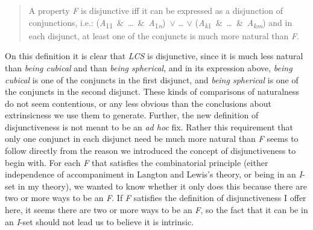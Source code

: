 \begin{quote}
A property \textit{F} is disjunctive iff it can be expressed as a disjunction of conjunctions, i.e.: (\textit{A}\textsubscript{11}~\&~{\dots}~\&~\textit{A}\textsubscript{1}\textit{\textsubscript{n}})~${\vee}$  {\dots} ${\vee}$ (\textit{A}\textit{\textsubscript{k}}\textsubscript{1}~\&~{\dots}~\&~\textit{A}\textit{\textsubscript{km}}) 
and in each disjunct, at least one of the conjuncts is much more natural than \textit{F}.
\end{quote}

\noindent On this definition it is clear that \textit{LCS} is disjunctive, since it is much less natural than \textit{being cubical} and than \textit{being spherical}, and in its expression above, \textit{being cubical} is one of the conjuncts in the first disjunct, and \textit{being spherical} is one of the conjuncts in the second disjunct. These kinds of comparisons of naturalness do not seem contentious, or any less obvious than the conclusions about extrinsicness we use them to generate. Further, the new definition of disjunctiveness is not meant to be an \textit{ad hoc} fix. Rather this requirement that only one conjunct in each disjunct need be much more natural than \textit{F} seems to follow directly from the reason we introduced the concept of disjunctiveness to begin with. For each \textit{F} that satisfies the combinatorial principle (either independence of accompaniment in Langton and Lewis's theory, or being in an \textit{I}\nobreakdash-set in my theory), we wanted to know whether it only does this because there are two or more ways to be an \textit{F}. If \textit{F} satisfies the definition of disjunctiveness I offer here, it seems there are two or more ways to be an \textit{F}, so the fact that it can be in an \textit{I}\nobreakdash-set should not lead us to believe it is intrinsic.

